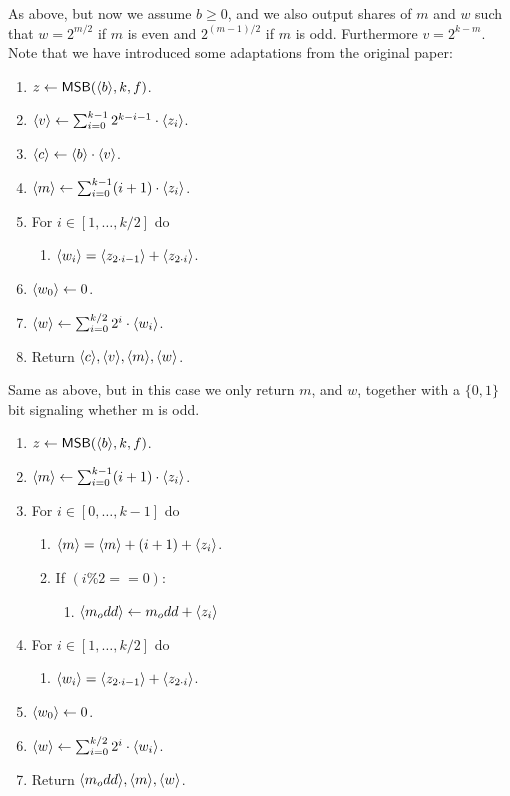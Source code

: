 As above, but now we assume $b \ge 0$, and we also
output shares of $m$ and $w$ such that $w=2^{m/2}$
if $m$ is even and $2^{(m-1)/2}$ if $m$ is odd. Furthermore $v = 2^{k-m}$. Note that we have introduced some adaptations from the original paper:
\begin{enumerate}
\item $z \leftarrow \mathsf{MSB}(\langle b \rangle,k,f)$.
\item $\langle v \rangle \leftarrow \sum_{i=0}^{k-1} 2^{k-i-1} \cdot \langle z_i \rangle$.
\item $\langle c \rangle \leftarrow \langle b \rangle \cdot \langle v \rangle$.
\item $\langle m \rangle \leftarrow \sum_{i=0}^{k-1} (i+1) \cdot \langle z_i \rangle$. 
\item For $i \in [1,\ldots,k/2]$ do
\begin{enumerate}
	\item $\langle w_i \rangle=\langle z_{2\cdot i-1} \rangle+\langle z_{2\cdot i} \rangle$.
\end{enumerate}
\item $\langle w_0 \rangle \leftarrow 0$. 
\item $\langle w \rangle \leftarrow \sum_{i=0}^{k/2} 2^i \cdot \langle w_i \rangle$.
\item Return $\langle c \rangle, \langle v \rangle, \langle m \rangle, \langle w \rangle$.
\end{enumerate}

Same as above, but in this case we only return $m$, and $w$, together with a $\{0,1\}$ bit signaling whether m is odd. 

\begin{enumerate}
\item $z \leftarrow \mathsf{MSB}(\langle b \rangle,k,f)$.

\item $\langle m \rangle \leftarrow \sum_{i=0}^{k-1} (i+1) \cdot \langle z_i \rangle$. 
\item For $i \in [0,\ldots,k-1]$ do
\begin{enumerate}
	\item $\langle m \rangle=\langle m \rangle+ (i+1) +\langle z_{i} \rangle$.
	\item If $(i \% 2 == 0)$:
	\begin{enumerate}
	    \item $\langle m_odd \rangle \leftarrow m_odd + \langle z_{i} \rangle$
	\end{enumerate}
\end{enumerate}
\item For $i \in [1,\ldots,k/2]$ do
\begin{enumerate}
	\item $\langle w_i \rangle=\langle z_{2\cdot i-1} \rangle+\langle z_{2\cdot i} \rangle$.
\end{enumerate}
\item $\langle w_0 \rangle \leftarrow 0$. 
\item $\langle w \rangle \leftarrow \sum_{i=0}^{k/2} 2^i \cdot \langle w_i \rangle$.

\item Return $\langle m_odd \rangle, \langle m \rangle, \langle w \rangle$.
\end{enumerate}


